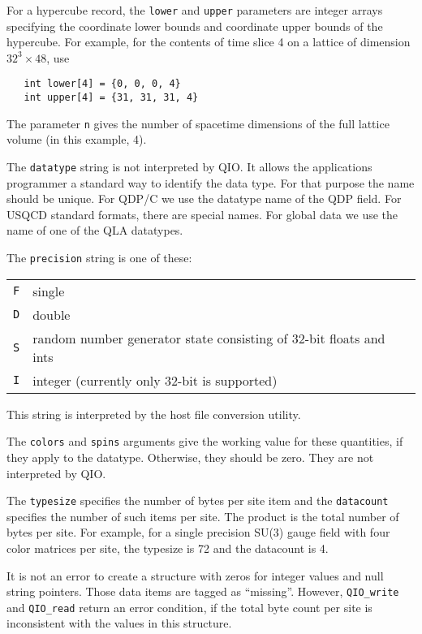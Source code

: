 \documentclass{article}
\begin{document}
For a hypercube record, the \verb|lower| and \verb|upper| parameters
are integer arrays specifying the coordinate lower bounds and
coordinate upper bounds of the hypercube.  For example, for the contents
of time slice 4 on a lattice of dimension $32^3 \times 48$, use
%
\begin{verbatim}
   int lower[4] = {0, 0, 0, 4}
   int upper[4] = {31, 31, 31, 4}
\end{verbatim}
%
The parameter \verb|n| gives the number of spacetime dimensions of the
full lattice volume (in this example, 4).

The \verb|datatype| string is not interpreted by QIO\@.  It allows the
applications programmer a standard way to identify the data type.  For
that purpose the name should be unique.  For QDP/C we use the datatype
name of the QDP field.  For USQCD standard formats, there are special
names.  For global data we use the name of one of the QLA datatypes.

The \verb|precision| string is one of these:
%
\begin{flushleft}
  \begin{tabular}{|l|l|}
\hline
    \verb|F| & single \\
    \verb|D| & double \\
    \verb|S| & random number generator state consisting of 32-bit floats and ints \\
    \verb|I| & integer (currently only 32-bit is supported)\\
\hline
  \end{tabular}
\end{flushleft}
%
This string is interpreted by the host file conversion utility.

The \verb|colors| and \verb|spins| arguments give the working value
for these quantities, if they apply to the datatype.  Otherwise, they
should be zero.  They are not interpreted by QIO\@.

The \verb|typesize| specifies the number of bytes per site item and
the \verb|datacount| specifies the number of such items per site.  The
product is the total number of bytes per site.  For example, for a
single precision SU(3) gauge field with four color matrices per site,
the typesize is 72 and the datacount is 4.

It is not an error to create a structure with zeros for integer values
and null string pointers.  Those data items are tagged as ``missing''.
However, \verb|QIO_write| and \verb|QIO_read| return an error
condition, if the total byte count per site is inconsistent with the
values in this structure.
\end{document}

